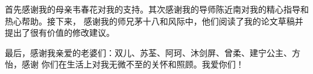 \documentclass[bachelor,fandolfonts,replaceperiod]{jnuthesis}
\begin{document}
    \begin{backmatter}
    
    \end{backmatter}

    \begin{acknowledgement}
        首先感谢我的母亲韦春花对我的支持。其次感谢我的导师陈近南对我的精心指导和热心帮助。接下来，
        感谢我的师兄茅十八和风际中，他们阅读了我的论文草稿并提出了很有价值的修改建议。
        
        最后，感谢我亲爱的老婆们：双儿、苏荃、阿珂、沐剑屏、曾柔、建宁公主、方怡，感谢
        你们在生活上对我无微不至的关怀和照顾。我爱你们！
    \end{acknowledgement}
    
\end{document}
